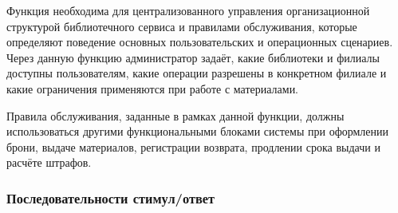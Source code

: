 \documentclass[12pt,a4paper]{article}
\begin{document}
	Функция необходима для централизованного управления организационной структурой
	библиотечного сервиса и правилами обслуживания, которые определяют поведение
	основных пользовательских и операционных сценариев. Через данную функцию
	администратор задаёт, какие библиотеки и филиалы доступны пользователям,
	какие операции разрешены в конкретном филиале и какие ограничения применяются
	при работе с материалами.
	
	Правила обслуживания, заданные в рамках данной функции, должны использоваться
	другими функциональными блоками системы при оформлении брони, выдаче
	материалов, регистрации возврата, продлении срока выдачи и расчёте штрафов.
	
	\subsubsection{Последовательности стимул/ответ}
	
\end{document}
